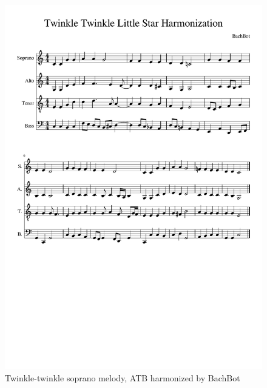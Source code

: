 \begin{figure}[htpb]
  \centering
  \includegraphics[trim={0 10cm 0 3.7cm},clip,width=0.9\linewidth]{twinkle-twinkle-score.pdf}
  \caption{Twinkle-twinkle soprano melody, ATB harmonized by BachBot}
  \label{fig:harm-twinkle-twinkle}
\end{figure}

